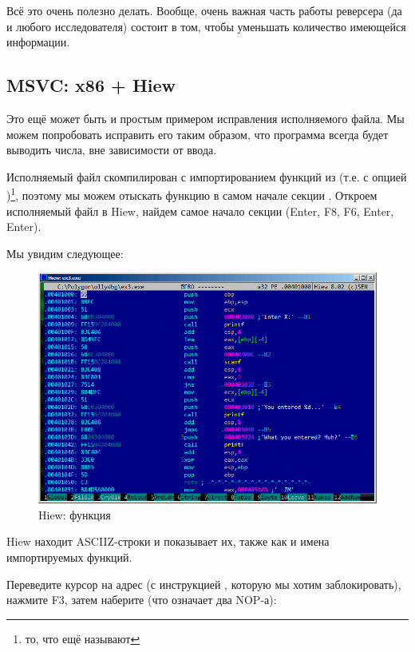 Всё это очень полезно делать.
Вообще, очень важная часть работы реверсера (да и любого исследователя) состоит в том, чтобы уменьшать количество имеющейся информации.



\clearpage
\subsection{MSVC: x86 + Hiew}

Это ещё может быть и простым примером исправления исполняемого файла.
Мы можем попробовать исправить его таким образом, что программа всегда будет выводить числа, вне зависимости от ввода.

Исполняемый файл скомпилирован с импортированием функций из
 (т.е. с опцией )\footnote{то, что ещё называют }, 
поэтому мы можем отыскать функцию \main в самом начале секции .
Откроем исполняемый файл в Hiew, найдем самое начало секции  (Enter, F8, F6, Enter, Enter).

Мы увидим следующее:

\begin{figure}[H]
\centering
\includegraphics[scale=\FigScale]{patterns/04_scanf/3_checking_retval/hiew_1.png}
\caption{Hiew: функция \main}
\label{fig:scanf_ex3_hiew_1}
\end{figure}

Hiew находит \ac{ASCIIZ}-строки и показывает их, также как и имена импортируемых функций.

\clearpage
Переведите курсор на адрес  (с инструкцией , которую мы хотим заблокировать), нажмите F3, затем наберите  (что означает два \ac{NOP}-а):

